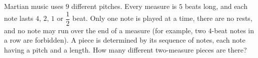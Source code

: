 Martian music uses $9$ different pitches. Every measure is $5$ beats long, and each note lasts $4$, $2$, $1$ or $\dfrac{1}{2}$ beat. Only one note is played at a time, there are no rests, and no note may run over the end of a measure (for example, two $4$-beat notes in a row are forbidden). A piece is determined by its sequence of notes, each note having a pitch and a length. How many different two-measure pieces are there?

